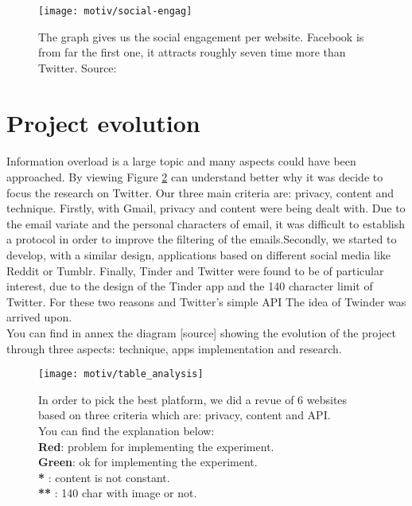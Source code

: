 \begin{figure}[h] 
\centering 
\texttt{[image: motiv/social-engag]} 
\caption[Social Media engagement]{The graph gives us the social engagement per website. Facebook is from far the first one, it attracts roughly seven time more than Twitter. Source: \cite{s_engag_stats}}
\label{fig:engagement} 
\end{figure}

\section{Project evolution}
\paragraph{}
Information overload is a large topic and many aspects could have been approached. By viewing Figure \ref{fig:table_analysis} can understand better why it was decide to focus the research on Twitter. Our three main criteria are: privacy, content and technique. Firstly, with Gmail, privacy and content were being dealt with. Due to the email variate and the personal characters of email, it was difficult to establish a protocol in order to improve the filtering of the emails.Secondly, we started to develop, with a similar design, applications based on different social media like Reddit or Tumblr. Finally, Tinder and Twitter were found to be of particular interest, due to the design of the Tinder app and the 140 character limit of Twitter. For these two reasons and Twitter's simple API The idea of Twinder was arrived upon.\\
You can find in annex the diagram [source] showing the evolution of the project through three aspects: technique, apps implementation and research.\\

\begin{figure}[tb] 
\centering 
\texttt{[image: motiv/table\_analysis]} 
\caption[Social Media comparison]{In order to pick the best platform, we did a revue of 6 websites based on three criteria which are: privacy, content and API. \\
You can find the explanation below: \\
\textbf{Red}: problem for implementing the experiment. \\
\textbf{Green}: ok for implementing the experiment. \\
\textbf{*} : content is not constant. \\
\textbf{**} : 140 char with image or not. \\
}
\label{fig:table_analysis} 
\end{figure}


